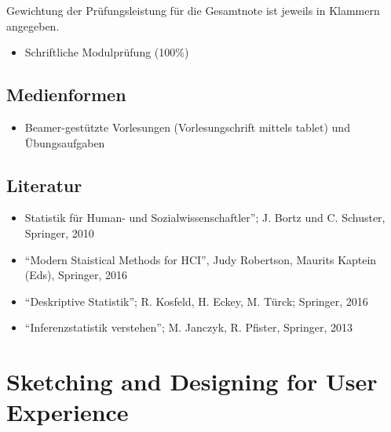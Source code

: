 Gewichtung der Prüfungsleistung für die Gesamtnote ist jeweils in
Klammern angegeben.

\begin{itemize}
\tightlist
\item
  Schriftliche Modulprüfung (100\%)
\end{itemize}

\section*{Medienformen\label{/mi-2017/modulbeschreibungen-master/MA_HCI_Modul_Statistical_Methods_for_HCI}}\label{medienformenpathlabelmi-2017modulbeschreibungen-mastermaux5fhciux5fmodulux5fstatisticalux5fmethodsux5fforux5fhci}

\begin{itemize}
\tightlist
\item
  Beamer-gestützte Vorlesungen (Vorlesungschrift mittels tablet) und
  Übungsaufgaben
\end{itemize}

\section*{Literatur\label{/mi-2017/modulbeschreibungen-master/MA_HCI_Modul_Statistical_Methods_for_HCI}}\label{literaturpathlabelmi-2017modulbeschreibungen-mastermaux5fhciux5fmodulux5fstatisticalux5fmethodsux5fforux5fhci}

\begin{itemize}
\tightlist
\item
  Statistik für Human- und Sozialwissenschaftler''; J. Bortz und C.
  Schuster, Springer, 2010
\item
  ``Modern Staistical Methods for HCI'', Judy Robertson, Maurits Kaptein
  (Eds), Springer, 2016
\item
  ``Deskriptive Statistik''; R. Kosfeld, H. Eckey, M. Türck; Springer,
  2016
\item
  ``Inferenzstatistik verstehen''; M. Janczyk, R. Pfister, Springer,
  2013
\end{itemize}

\chapter{Sketching and Designing for User
Experience\label{/mi-2017/modulbeschreibungen-master/MA_HCI_Sketching_and_Designing_for_User_Experience}}\label{sketching-and-designing-for-user-experiencepathlabelmi-2017modulbeschreibungen-mastermaux5fhciux5fsketchingux5fandux5fdesigningux5fforux5fuserux5fexperience}

